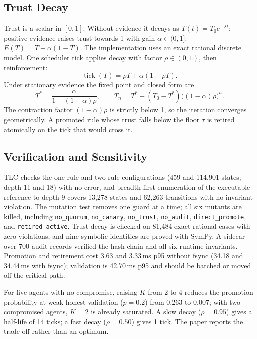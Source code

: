 \documentclass[conference]{IEEEtran}
\newcommand{\feat}[1]{\texttt{#1}}
\begin{document}
\subsection{Trust Decay}
Trust is a scalar in $[0,1]$. Without evidence it decays as $T(t)=T_0e^{-\lambda t}$; positive evidence raises trust towards 1 with gain $\alpha\in(0,1]$: $E(T)=T+\alpha(1-T)$. The implementation uses an exact rational discrete model. One scheduler tick applies decay with factor $\rho\in(0,1)$, then reinforcement:
\begin{equation}
\operatorname{tick}(T)=\rho T+\alpha(1-\rho T).
\end{equation}
Under stationary evidence the fixed point and closed form are
\begin{equation}
T^\ast=\frac{\alpha}{1-(1-\alpha)\rho},\qquad
T_n=T^\ast+(T_0-T^\ast)\bigl((1-\alpha)\rho\bigr)^n.
\end{equation}
The contraction factor $(1-\alpha)\rho$ is strictly below 1, so the iteration converges geometrically. A promoted rule whose trust falls below the floor $\tau$ is retired atomically on the tick that would cross it.

\subsection{Verification and Sensitivity}
TLC checks the one-rule and two-rule configurations (459 and 114,901 states; depth 11 and 18) with no error, and breadth-first enumeration of the executable reference to depth 9 covers 13,278 states and 62,263 transitions with no invariant violation. The mutation test removes one guard at a time; all six mutants are killed, including \feat{no\_quorum}, \feat{no\_canary}, \feat{no\_trust}, \feat{no\_audit}, \feat{direct\_promote}, and \feat{retired\_active}. Trust decay is checked on 81,484 exact-rational cases with zero violations, and nine symbolic identities are proved with SymPy. A sidecar over 700 audit records verified the hash chain and all six runtime invariants. Promotion and retirement cost 3.63 and 3.33\,ms p95 without fsync (34.18 and 34.44\,ms with fsync); validation is 42.70\,ms p95 and should be batched or moved off the critical path.

For five agents with no compromise, raising $K$ from 2 to 4 reduces the promotion probability at weak honest validation ($p=0.2$) from 0.263 to 0.007; with two compromised agents, $K=2$ is already saturated. A slow decay ($\rho=0.95$) gives a half-life of 14 ticks; a fast decay ($\rho=0.50$) gives 1 tick. The paper reports the trade-off rather than an optimum.
\end{document}
